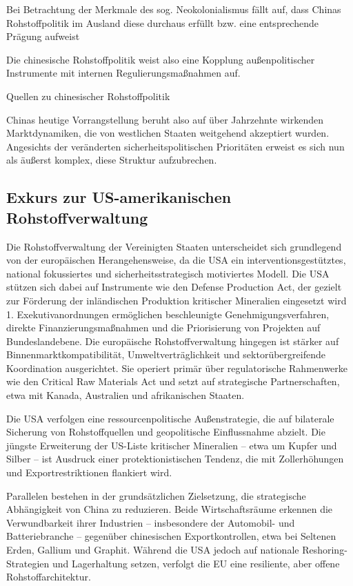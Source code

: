 \documentclass[12pt,a4paper,oneside]{book} %
\begin{document}
Bei Betrachtung der Merkmale des sog. Neokolonialismus fällt auf, dass Chinas Rohstoffpolitik im Ausland diese durchaus erfüllt bzw. eine entsprechende Prägung aufweist

Die chinesische Rohstoffpolitik weist also eine Kopplung außenpolitischer Instrumente mit internen Regulierungsmaßnahmen auf. 

Quellen zu chinesischer Rohstoffpolitik

Chinas heutige Vorrangstellung beruht also auf über Jahrzehnte wirkenden Marktdynamiken, die von westlichen Staaten weitgehend akzeptiert wurden. Angesichts der veränderten sicherheitspolitischen Prioritäten erweist es sich nun als äußerst komplex, diese Struktur aufzubrechen.

\subsection{Exkurs zur US-amerikanischen Rohstoffverwaltung}
Die Rohstoffverwaltung der Vereinigten Staaten unterscheidet sich grundlegend von der europäischen Herangehensweise, da die USA ein interventionsgestütztes, national fokussiertes und sicherheitsstrategisch motiviertes Modell. Die USA stützen sich dabei auf Instrumente wie den Defense Production Act, der gezielt zur Förderung der inländischen Produktion kritischer Mineralien eingesetzt wird 1. Exekutivanordnungen ermöglichen beschleunigte Genehmigungsverfahren, direkte Finanzierungsmaßnahmen und die Priorisierung von Projekten auf Bundeslandebene. Die europäische Rohstoffverwaltung hingegen ist stärker auf Binnenmarktkompatibilität, Umweltverträglichkeit und sektorübergreifende Koordination ausgerichtet. Sie operiert primär über regulatorische Rahmenwerke wie den Critical Raw Materials Act und setzt auf strategische Partnerschaften, etwa mit Kanada, Australien und afrikanischen Staaten.

Die USA verfolgen eine ressourcenpolitische Außenstrategie, die auf bilaterale Sicherung von Rohstoffquellen und geopolitische Einflussnahme abzielt. Die jüngste Erweiterung der US-Liste kritischer Mineralien – etwa um Kupfer und Silber – ist Ausdruck einer protektionistischen Tendenz, die mit Zollerhöhungen und Exportrestriktionen flankiert wird.

Parallelen bestehen in der grundsätzlichen Zielsetzung, die strategische Abhängigkeit von China zu reduzieren. Beide Wirtschaftsräume erkennen die Verwundbarkeit ihrer Industrien – insbesondere der Automobil- und Batteriebranche – gegenüber chinesischen Exportkontrollen, etwa bei Seltenen Erden, Gallium und Graphit. Während die USA jedoch auf nationale Reshoring-Strategien und Lagerhaltung setzen, verfolgt die EU eine resiliente, aber offene Rohstoffarchitektur.
\end{document}
